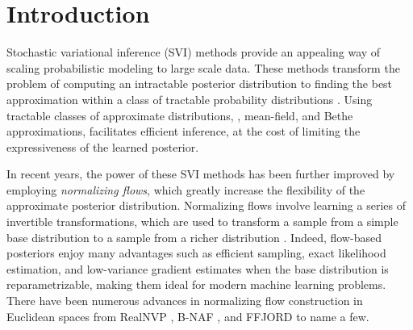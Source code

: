 \section{Introduction}
Stochastic variational inference (SVI) methods provide an appealing way of scaling probabilistic modeling to large scale data.
These methods transform the problem of computing an intractable posterior distribution to finding the best approximation within a class of tractable probability distributions \cite{hoffman2013stochastic}.
Using tractable classes of approximate distributions, \eg, mean-field, and Bethe approximations, facilitates efficient inference, at the cost of limiting the expressiveness of the learned posterior. 

In recent years, the power of these SVI methods has been further improved by employing {\em normalizing flows}, which greatly increase the flexibility of the approximate posterior distribution. 
Normalizing flows involve learning a series of invertible transformations, which are used to transform a sample from a simple base distribution to a sample from a richer distribution \cite{rezende2015variational}. 
Indeed, flow-based posteriors enjoy many advantages such as efficient sampling, exact likelihood estimation, and low-variance gradient estimates when the base distribution is reparametrizable, making them ideal for modern machine learning problems.
There have been numerous advances in normalizing flow construction in Euclidean spaces from RealNVP \cite{dinh2016density}, B-NAF \cite{huang2018neural,de2019block}, and FFJORD \cite{grathwohl2018ffjord} to name a few.

